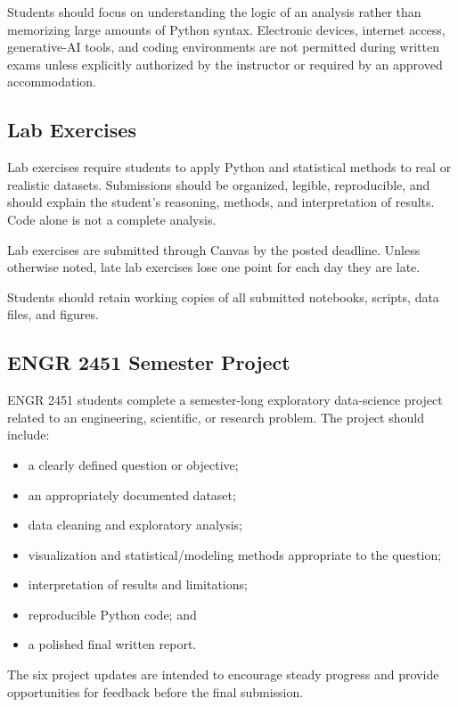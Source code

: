 \documentclass[11pt]{article}
\begin{document}
Students should focus on understanding the logic of an analysis rather than memorizing large amounts of Python syntax. Electronic devices, internet access, generative-AI tools, and coding environments are not permitted during written exams unless explicitly authorized by the instructor or required by an approved accommodation.

\subsection{Lab Exercises}

Lab exercises require students to apply Python and statistical methods to real or realistic datasets. Submissions should be organized, legible, reproducible, and should explain the student's reasoning, methods, and interpretation of results. Code alone is not a complete analysis.

Lab exercises are submitted through Canvas by the posted deadline. Unless otherwise noted, late lab exercises lose one point for each day they are late.

Students should retain working copies of all submitted notebooks, scripts, data files, and figures.

\subsection{ENGR 2451 Semester Project}

ENGR 2451 students complete a semester-long exploratory data-science project related to an engineering, scientific, or research problem. The project should include:

\begin{itemize}
  \item a clearly defined question or objective;
  \item an appropriately documented dataset;
  \item data cleaning and exploratory analysis;
  \item visualization and statistical/modeling methods appropriate to the question;
  \item interpretation of results and limitations;
  \item reproducible Python code; and
  \item a polished final written report.
\end{itemize}

The six project updates are intended to encourage steady progress and provide opportunities for feedback before the final submission.
\end{document}
